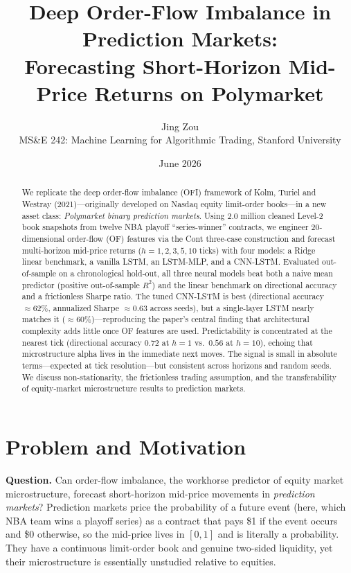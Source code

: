\documentclass[10pt,twocolumn]{article}
\title{\vspace{-2.5em}\textbf{Deep Order-Flow Imbalance in Prediction Markets:\\
Forecasting Short-Horizon Mid-Price Returns on Polymarket}}
\author{Jing Zou\\
\small MS\&E 242: Machine Learning for Algorithmic Trading, Stanford University}
\date{\vspace{-0.8em}\small June 2026}
\begin{document}
\maketitle

\begin{abstract}
\noindent
We replicate the deep order-flow imbalance (OFI) framework of Kolm, Turiel and
Westray (2021)---originally developed on Nasdaq equity limit-order books---in a
new asset class: \emph{Polymarket binary prediction markets}. Using 2.0 million
cleaned Level-2 book snapshots from twelve NBA playoff ``series-winner''
contracts, we engineer 20-dimensional order-flow (OF) features via the Cont
three-case construction and forecast multi-horizon mid-price returns
($h=1,2,3,5,10$ ticks) with four models: a Ridge linear benchmark, a vanilla
LSTM, an LSTM-MLP, and a CNN-LSTM. Evaluated out-of-sample on a chronological
hold-out, all three neural models beat both a naive mean predictor (positive
out-of-sample $R^2$) and the linear benchmark on directional accuracy and a
frictionless Sharpe ratio. The tuned CNN-LSTM is best (directional accuracy
$\approx 62\%$, annualized Sharpe $\approx 0.63$ across seeds), but a single-layer
LSTM nearly matches it ($\approx 60\%$)---reproducing the paper's central finding
that architectural complexity adds little once OF features are used. Predictability
is concentrated at the nearest tick (directional accuracy $0.72$ at $h{=}1$ vs.\
$0.56$ at $h{=}10$), echoing that microstructure alpha lives in the immediate
next moves. The signal is small in absolute terms---expected at tick
resolution---but consistent across horizons and random seeds. We discuss
non-stationarity, the frictionless trading assumption, and the transferability of
equity-market microstructure results to prediction markets.
\end{abstract}

\section{Problem and Motivation}

\textbf{Question.} Can order-flow imbalance, the workhorse predictor of equity
market microstructure, forecast short-horizon mid-price movements in
\emph{prediction markets}? Prediction markets price the probability of a future
event (here, which NBA team wins a playoff series) as a contract that pays \$1 if
the event occurs and \$0 otherwise, so the mid-price lives in $[0,1]$ and is
literally a probability. They have a continuous limit-order book and genuine
two-sided liquidity, yet their microstructure is essentially unstudied relative to
equities.
\end{document}
